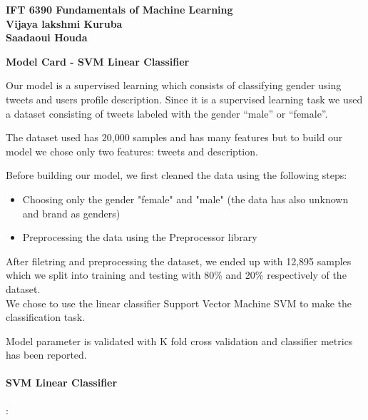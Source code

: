 \documentclass[11pt]{article}
\begin{document}
\setlength{\parskip}{0.3cm} \setlength{\parindent}{0cm}

\begin{center}
\textbf{{IFT 6390 Fundamentals of Machine Learning \\ Vijaya lakshmi Kuruba\\ Saadaoui Houda}}
\par\end{center}{\large \par}

\begin{center}
\textbf{\LARGE{{Model Card - SVM Linear Classifier}}}
\par\end{center}{\LARGE \par}

Our model is a supervised learning which consists of classifying gender using tweets and users profile description. 
Since it is a supervised learning task we used a dataset consisting of tweets labeled with the gender “male” or “female”.

The dataset used has 20,000 samples and has many features but to build our model we chose only two features: tweets and description.

Before building our model, we first cleaned the data using the following steps:
\begin{itemize}
    \item Choosing only the gender "female" and "male" (the data has also unknown and brand as genders)
    \item Preprocessing the data using the Preprocessor library
\end{itemize}

After filetring and preprocessing the dataset, we ended up with 12,895 samples which we split into training and testing with 80\% and 20\% respectively of the dataset.  \\
We chose to use the linear classifier Support Vector Machine SVM to make the classification task.

Model parameter is validated with K fold cross validation and classifier metrics has been reported.

\paragraph{SVM Linear Classifier}: 
\end{document}
